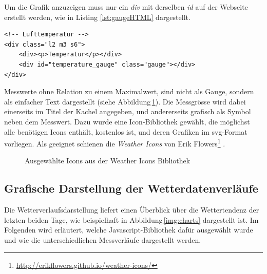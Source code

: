 \noindent
Um die Grafik anzuzeigen muss nur ein \emph{div} mit derselben \emph{id} auf der Webseite erstellt werden, wie in Listing \ref{lst:gaugeHTML} dargestellt.

\vspace{3mm}
\begin{lstlisting}[label=lst:gaugeHTML,caption=Container für die Gauge auf der Webseite, language=HTML5, style=htmlcssjs]
<!-- Lufttemperatur -->
<div class="l2 m3 s6">
    <div><p>Temperatur</p></div>
    <div id="temperature_gauge" class="gauge"></div>
</div>
\end{lstlisting}
\vspace{3mm}


\noindent
Messwerte ohne Relation zu einem Maximalwert, sind nicht als Gauge, sondern als einfacher Text dargestellt (siehe Abbildung\,\ref{img:icons}). Die Messgrösse wird dabei einerseits im Titel der Kachel angegeben, und andererseits grafisch als Symbol neben dem Messwert. Dazu wurde eine Icon-Bibliothek gewählt, die möglichst alle benötigen Icons enthält, kostenlos ist, und deren Grafiken im svg-Format vorliegen. Als geeignet schienen die \emph{Weather Icons} von Erik Flowers\footnote{ \url{http://erikflowers.github.io/weather-icons/}} .


\vspace{3mm}
\begin{figure}[htb!]
	\centering
	\caption{Ausgewählte Icons aus der Weather Icons Bibliothek}
	\label{img:icons}
\end{figure}



\subsection{Grafische Darstellung der Wetterdatenverläufe}
Die Wetterverlaufsdarstellung liefert einen Überblick über die Wettertendenz der letzten beiden Tage, wie beispielhaft in Abbildung\,\ref{img:charts} dargestellt ist. Im Folgenden wird erläutert, welche Javascript-Bibliothek dafür ausgewählt wurde und wie die unterschiedlichen Messverläufe dargestellt werden.

